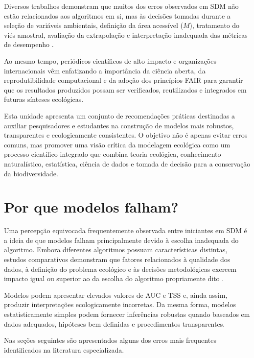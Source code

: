 \documentclass{ueap-sdm}
\begin{document}
Diversos trabalhos demonstram que muitos dos erros observados em SDM não estão
relacionados aos algoritmos em si, mas às decisões tomadas durante a seleção de
variáveis ambientais, definição da área acessível ($M$), tratamento do viés
amostral, avaliação da extrapolação e interpretação inadequada das métricas de
desempenho \citep{guisan2000predictive, elith2006novel,
	barve2011crucial, guisan2017habitat, zurell2020standard}.

Ao mesmo tempo, periódicos científicos de alto impacto e organizações
internacionais vêm enfatizando a importância da ciência aberta, da
reprodutibilidade computacional e da adoção dos princípios FAIR para garantir
que os resultados produzidos possam ser verificados, reutilizados e integrados
em futuras sínteses ecológicas.

Esta unidade apresenta um conjunto de recomendações práticas destinadas a
auxiliar pesquisadores e estudantes na construção de modelos mais robustos,
transparentes e ecologicamente consistentes. O objetivo não é apenas evitar
erros comuns, mas promover uma visão crítica da modelagem ecológica como um
processo científico integrado que combina teoria ecológica, conhecimento
naturalístico, estatística, ciência de dados e tomada de decisão para a
conservação da biodiversidade.

\section{Por que modelos falham?}

Uma percepção equivocada frequentemente observada entre iniciantes em SDM é a
ideia de que modelos falham principalmente devido à escolha inadequada do
algoritmo. Embora diferentes algoritmos possuam características distintas,
estudos comparativos demonstram que fatores relacionados à qualidade dos dados,
à definição do problema ecológico e às decisões metodológicas exercem impacto
igual ou superior ao da escolha do algoritmo propriamente dito
\citep{elith2006novel, araujo2007ensemble, guisan2017habitat}.

Modelos podem apresentar elevados valores de AUC e TSS e, ainda assim,
produzir interpretações ecologicamente incorretas. Da mesma forma, modelos
estatisticamente simples podem fornecer inferências robustas quando baseados em
dados adequados, hipóteses bem definidas e procedimentos transparentes.

Nas seções seguintes são apresentados alguns dos erros mais frequentes
identificados na literatura especializada.
\end{document}
